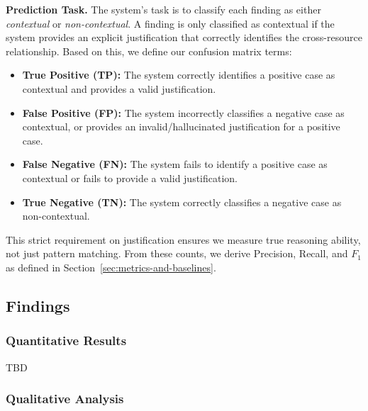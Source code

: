 \textbf{Prediction Task.} The system's task is to classify each finding as either \emph{contextual} or \emph{non-contextual}. A finding is only classified as contextual if the system provides an explicit justification that correctly identifies the cross-resource relationship. Based on this, we define our confusion matrix terms:
\begin{itemize}
    \item \textbf{True Positive (TP):} The system correctly identifies a positive case as contextual and provides a valid justification.
    \item \textbf{False Positive (FP):} The system incorrectly classifies a negative case as contextual, or provides an invalid/hallucinated justification for a positive case.
    \item \textbf{False Negative (FN):} The system fails to identify a positive case as contextual or fails to provide a valid justification.
    \item \textbf{True Negative (TN):} The system correctly classifies a negative case as non-contextual.
\end{itemize}
This strict requirement on justification ensures we measure true reasoning ability, not just pattern matching. From these counts, we derive Precision, Recall, and $F_1$ as defined in Section~\ref{sec:metrics-and-baselines}.

\subsection{Findings}

\subsubsection*{Quantitative Results}

TBD


\subsubsection*{Qualitative Analysis}


